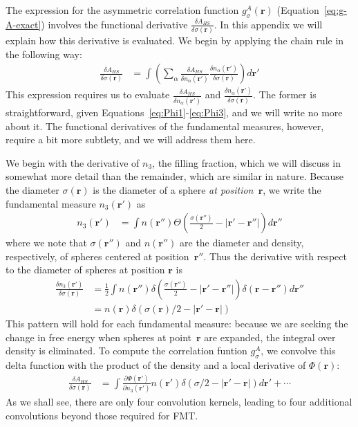\documentclass[letterpaper,twocolumn,amsmath,amssymb,pre]{revtex4-1}
\newcommand{\rr}{\textbf{r}}
\begin{document}
The expression for the asymmetric correlation function
$g_\sigma^A(\rr)$ (Equation~\ref{eq:g-A-exact}) involves the
functional derivative $\frac{\delta A_{HS}}{\delta
  \sigma(\mathbf{r})}$.  In this appendix we will explain how this
derivative is evaluated.  We begin by applying the chain rule in the
following way:
  \begin{align}
    \frac{\delta A_{HS}}{\delta \sigma(\mathbf{r})} &=
    \int \left(
    \sum_\alpha
    \frac{\delta A_{HS}}{\delta n_\alpha(\mathbf{r}')}
    \frac{\delta n_\alpha(\mathbf{r}')}{\delta \sigma(\mathbf{r})}
    \right) d\mathbf{r}'
  \end{align}
This expression requires us to evaluate $\frac{\delta A_{HS}}{\delta
  n_\alpha(\mathbf{r}')}$ and $\frac{\delta
  n_\alpha(\mathbf{r}')}{\delta \sigma(\mathbf{r})}$.  The former is
straightforward, given Equations~\ref{eq:Phi1}-\ref{eq:Phi3}, and we
will write no more about it.  The functional derivatives of the
fundamental measures, however, require a bit more subtlety, and we
will address them here.

We begin with the derivative of $n_3$, the filling fraction, which we
will discuss in somewhat more detail than the remainder, which are
similar in nature.  Because the diameter $\sigma(\rr)$ is the diameter
of a sphere \emph{at position~$\rr$}, we write the fundamental measure
$n_3(\rr')$ as
\begin{align}
  n_3(\rr') &= \int n(\rr'') \Theta\left(\frac{\sigma(\rr'')}{2}
  -\left|\rr' - \rr''\right|\right)
  d\rr''
\end{align}
where we note that $\sigma(\rr'')$ and $n(\rr'')$ are the diameter and
density, respectively, of spheres centered at position~$\rr''$.  Thus the
derivative with respect to the diameter of spheres at position
$\rr$ is
\begin{align}
  \frac{\delta n_3(\rr')}{\delta \sigma(\rr)} &= \frac 12 \int n
  (\rr'') \delta\left(\frac{\sigma(\rr'')}{2} -\left|\rr' - \rr''\right|\right)
  \delta(\rr-\rr'') d\rr'' \\ &= n (\rr) \delta(\sigma(\rr)/2
  -\left|\rr' - \rr\right|)
\end{align}
This pattern will hold for each fundamental measure: because we are
seeking the change in free energy when spheres at point~$\rr$ are
expanded, the integral over density is eliminated.  To compute the
correlation funtion $g_\sigma^A$, we convolve this delta function with
the product of the density and a local derivative of $\Phi(\rr)$:
\begin{align}
  \frac{\delta A_{HS}}{\delta \sigma(\rr)} &= \int \frac{\partial \Phi(\rr')}{\partial
    n_3(\rr')}n(\rr') \delta(\sigma/2-|\rr'-\rr|)d\rr'
  + \cdots
\end{align}
As we shall see, there are only four convolution kernels, leading to
four additional convolutions beyond those required for FMT.
\end{document}
